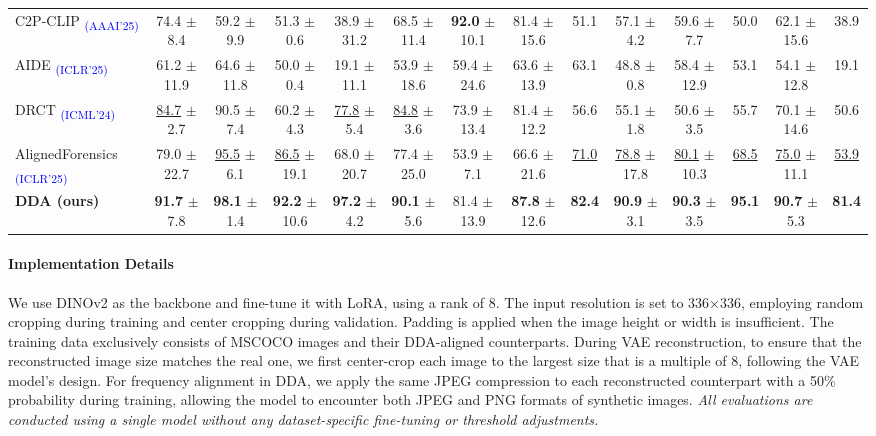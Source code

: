 \documentclass{article}
\begin{document}
\begin{table}[t!]
\begin{adjustbox}{width=1.0\linewidth}
\begin{tabular}{lccccccccccccc}
C2P-CLIP \textsubscript{\textcolor{blue}{(AAAI'25)}} \cite{tan2024c2p} & 74.4 $\pm$ 8.4 & 59.2 $\pm$ 9.9 & 51.3 $\pm$ 0.6 & 38.9 $\pm$ 31.2 & 68.5 $\pm$ 11.4 & \textbf{92.0} $\pm$ 10.1 & 81.4 $\pm$ 15.6 & 51.1 & 57.1 $\pm$ 4.2 & 59.6 $\pm$ 7.7 & 50.0 & 62.1 $\pm$ 15.6 & 38.9 \\
AIDE \textsubscript{\textcolor{blue}{(ICLR'25)}} \cite{yan2024sanity} & 61.2 $\pm$ 11.9 & 64.6 $\pm$ 11.8 & 50.0 $\pm$ 0.4 & 19.1 $\pm$ 11.1 & 53.9 $\pm$ 18.6 & 59.4 $\pm$ 24.6 & 63.6 $\pm$ 13.9 & 63.1 & 48.8 $\pm$ 0.8 & 58.4 $\pm$ 12.9 & 53.1 & 54.1 $\pm$ 12.8 & 19.1 \\
DRCT \textsubscript{\textcolor{blue}{(ICML'24)}} \cite{chen2024drct} & \underline{84.7} $\pm$ 2.7 & 90.5 $\pm$ 7.4 & 60.2 $\pm$ 4.3 & \underline{77.8} $\pm$ 5.4 & \underline{84.8} $\pm$ 3.6 & 73.9 $\pm$ 13.4 & 81.4 $\pm$ 12.2 & 56.6 & 55.1 $\pm$ 1.8 & 50.6 $\pm$ 3.5 & 55.7 & 70.1 $\pm$ 14.6 & 50.6 \\
AlignedForensics \textsubscript{\textcolor{blue}{(ICLR'25)}} \cite{rajan2025aligned} & 79.0 $\pm$ 22.7 & \underline{95.5} $\pm$ 6.1 & \underline{86.5} $\pm$ 19.1 & 68.0 $\pm$ 20.7 & 77.4 $\pm$ 25.0 & 53.9 $\pm$ 7.1 & 66.6 $\pm$ 21.6 & \underline{71.0} & \underline{78.8} $\pm$ 17.8 & \underline{80.1} $\pm$ 10.3 & \underline{68.5} & \underline{75.0} $\pm$ 11.1 & \underline{53.9} \\
\midrule
\rowcolor{myblue}
\textbf{DDA (ours)} & \textbf{91.7} $\pm$ 7.8 & \textbf{98.1} $\pm$ 1.4 & \textbf{92.2} $\pm$ 10.6 & \textbf{97.2} $\pm$ 4.2 & \textbf{90.1} $\pm$ 5.6 & 81.4 $\pm$ 13.9 & \textbf{87.8} $\pm$ 12.6 & \textbf{82.4} & \textbf{90.9} $\pm$ 3.1 & \textbf{90.3} $\pm$ 3.5 & \textbf{95.1} & \textbf{90.7} $\pm$ 5.3 & \textbf{81.4} \\
\bottomrule
\end{tabular}
\end{adjustbox}
\vspace{-10pt}
\end{table}


\paragraph{Implementation Details} We use DINOv2 as the backbone and fine-tune it with LoRA, using a rank of 8. The input resolution is set to 336×336, employing random cropping during training and center cropping during validation. Padding is applied when the image height or width is insufficient. The training data exclusively consists of MSCOCO \cite{lin2014microsoft} images and their DDA-aligned counterparts. During VAE reconstruction, to ensure that the reconstructed image size matches the real one, we first center-crop each image to the largest size that is a multiple of 8, following the VAE model’s design. For frequency alignment in DDA, we apply the same JPEG compression to each reconstructed counterpart with a 50\% probability during training, allowing the model to encounter both JPEG and PNG formats of synthetic images. \emph{All evaluations are conducted using a single model without any dataset-specific fine-tuning or threshold adjustments.}
\end{document}
